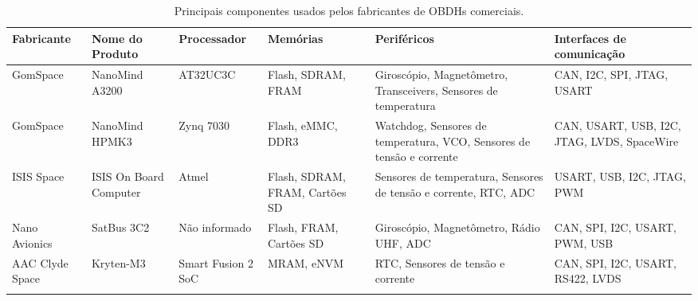 \begin{table}[htb]
    \centering
	\ABNTEXfontereduzida
	\caption{\label{tab:Tab_Rev}Principais componentes usados pelos fabricantes de OBDHs comerciais.}
    \begin{tabular}{@{}p{2cm}p{2.6cm}p{2cm}p{2cm}p{2.2cm}p{2.6cm}@{}}
		\toprule
		\textbf{Fabricante} & \textbf{Nome do Produto} & \textbf{Processador} & \textbf{Memórias} & \textbf{Periféricos} & \textbf{Interfaces de comunicação} \\ 
        \midrule
        GomSpace & NanoMind A3200 & AT32UC3C & Flash, SDRAM, FRAM & Giroscópio, Magnetômetro, Transceivers, Sensores de temperatura & CAN, I2C, SPI, JTAG, USART \\%
        
        \midrule
        GomSpace & NanoMind HPMK3 & Zynq 7030 & Flash, eMMC, DDR3 & Watchdog, Sensores de temperatura, VCO, Sensores de tensão e corrente & CAN, USART, USB, I2C, JTAG, LVDS, SpaceWire \\ %

        \midrule
        ISIS Space & ISIS On Board Computer & Atmel & Flash, SDRAM, FRAM, Cartões SD & Sensores de temperatura, Sensores de tensão e corrente, RTC, ADC & USART, USB, I2C, JTAG, PWM \\ %

        \midrule
        Nano Avionics & SatBus 3C2 & Não informado & Flash, FRAM, Cartões SD & Giroscópio, Magnetômetro, Rádio UHF, ADC & CAN, SPI, I2C, USART, PWM, USB \\ %

        \midrule
        AAC Clyde Space & Kryten-M3 & Smart Fusion 2 SoC & MRAM, eNVM & RTC, Sensores de tensão e corrente & CAN, SPI, I2C, USART, RS422, LVDS \\ %


		
        \\ \bottomrule
	\end{tabular}
\end{table}

